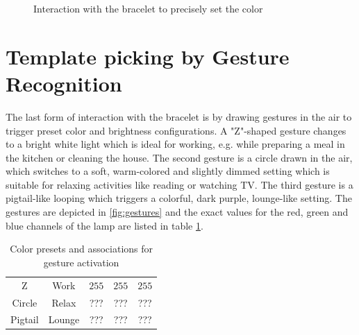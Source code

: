 \begin{figure}[bth]
	\myfloatalign
	 \quad
	\label{fig:hslinteraction}
	\caption{Interaction with the bracelet to precisely set the color}
\end{figure}

\section{Template picking by Gesture Recognition}
The last form of interaction with the bracelet is by drawing gestures in the air to trigger preset color and brightness configurations. A "Z"-shaped gesture changes to a bright white light which is ideal for working, e.g. while preparing a meal in the kitchen or cleaning the house. The second gesture is a circle drawn in the air, which switches to a soft, warm-colored and slightly dimmed setting which is suitable for relaxing activities like reading or watching TV. The third gesture is a pigtail-like looping which triggers a colorful, dark purple, lounge-like setting. The gestures are depicted in \ref{fig:gestures} and the exact values for the red, green and blue channels of the lamp are listed in table \ref{tab:colors}.

\begin{table}
	\myfloatalign
	\begin{tabularx}{.8\textwidth}{ccccc}
		\toprule
		\tableheadline{Gesture} & \tableheadline{Association} & \tableheadline{Red} & \tableheadline{Green} & \tableheadline{Blue}\\ 
		\midrule
		Z & Work & $ 255 $ & $ 255 $ & $ 255 $\\
		Circle & Relax & ??? & ??? & ???\\
		Pigtail & Lounge & ??? & ??? & ???\\
		\bottomrule
	\end{tabularx}
	\caption[Color presets for gesture activation]{Color presets and associations for gesture activation}  \label{tab:colors}
\end{table}

